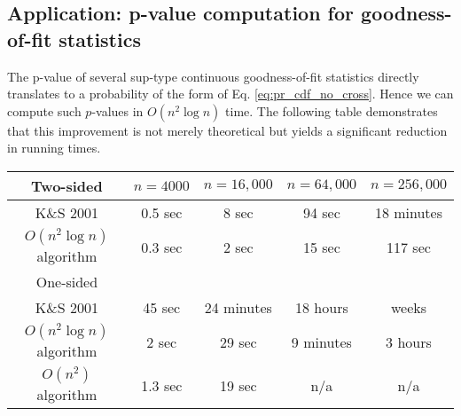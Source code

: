 \documentclass[a0,portrait]{a0poster}
\renewcommand{\emph}[1]{{\color{emphtextcolor}#1}}
\newcommand{\framedblock}[1]{\begin{framed}#1\end{framed}}
\newcommand{\shadedblock}[1]{\begin{shaded}#1\end{shaded}}
\newcommand{\lemmablock}[1]{\colorlet{shadecolor}{color1bright}\shadedblock{\noindent \emph{Lemma.}#1}}
\newcommand{\sectiontitle}[1]{\section*{\huge \color{textcolor}#1}}
\begin{document}
{\begin{multicols}{2}
\sectiontitle{Application: p-value computation for goodness-of-fit statistics}
\noindent The p-value of several sup-type continuous goodness-of-fit statistics directly translates to a probability
of the form of Eq. \eqref{eq:pr_cdf_no_cross}.
Hence we can compute such $p$-values in $O(n^2 \log n)$ time.
The following table demonstrates that this improvement is not merely theoretical but yields a significant reduction
in running times.\\
\begin{center}
    \centering
    \framedblock{
        \begin{tabular}{c c c c c} 
            \emph{Two-sided}    & $n=4000$ & $n=16,000$ & $n=64,000$ & $n=256,000$ \\ \hline
            \emph{K\&S 2001}          & 0.5 sec  & 8 sec      &  94 sec    & 18 minutes  \\
            \emph{$O(n^2 \log n)$ algorithm}         & 0.3 sec  & 2 sec      &  15 sec    & 117 sec \\[0.5cm]
            \emph{One-sided}&  \\\hline
            \emph{K\&S 2001}          & 45 sec   & 24 minutes & 18 hours   & weeks \\
            \emph{$O(n^2 \log n)$ algorithm}         & 2 sec    & 29 sec     & 9 minutes  & 3 hours\\
            \emph{$O(n^2)$ algorithm} & 1.3 sec  & 19 sec     & n/a        & n/a 
        \end{tabular}
    }
    \label{tbl:running_times}
\end{center}


\end{multicols}}
\end{document}
